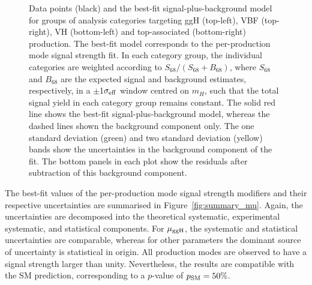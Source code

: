 \begin{figure}[htbp]
{    Data points (black) and the best-fit signal-plus-background model for groups of analysis categories targeting ggH (top-left), VBF (top-right), VH (bottom-left) and top-associated (bottom-right) production. The best-fit model corresponds to the per-production mode signal strength fit. In each category group, the individual categories are weighted according to $S_{68}/(S_{68}+B_{68})$, where $S_{68}$ and $B_{68}$ are the expected signal and background estimates, respectively, in a $\pm$1$\sigma_{\rm{eff}}$ window centred on $m_H$, such that the total signal yield in each category group remains constant. The solid red line shows the best-fit signal-plus-background model, whereas the dashed lines shown the background component only. The one standard deviation (green) and two standard deviation (yellow) bands show the uncertainties in the background component of the fit. The bottom panels in each plot show the residuals after subtraction of this background component.
  }
  \label{fig:sb_inclusive}
\end{figure}

The best-fit values of the per-production mode signal strength modifiers and their respective uncertainties are summarised in Figure~\ref{fig:summary_mu}. Again, the uncertainties are decomposed into the theoretical systematic, experimental systematic, and statistical components. For $\mu_{\rm{ggH}}$, the systematic and statistical uncertainties are comparable, whereas for other parameters the dominant source of uncertainty is statistical in origin. All production modes are observed to have a signal strength larger than unity. Nevertheless, the results are compatible with the SM prediction, corresponding to a $p$-value of $p_{\rm{SM}}=50\%$.

